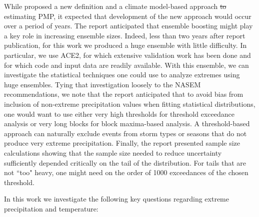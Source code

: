 \documentclass{ametsocV6.1}
\providecommand{\DIFadd}[1]{{\protect\color{blue}\uwave{#1}}} %
\providecommand{\DIFdel}[1]{{\protect\color{red}\sout{#1}}}                      %
\providecommand{\DIFaddbegin}{} %
\providecommand{\DIFaddend}{} %
\providecommand{\DIFdelbegin}{} %
\providecommand{\DIFdelend}{} %
\newcommand{\DIFscaledelfig}{0.5}
\newlength{\DIFdelgraphicswidth} %
\newlength{\DIFdelgraphicsheight} %
\newcommand{\DIFaddincludegraphics}[2][]{{\color{blue}\fbox{\DIFOincludegraphics[#1]{#2}}}} %
\newcommand{\DIFdelincludegraphics}[2][]{%
\sbox{\DIFdelgraphicsbox}{\DIFOincludegraphics[#1]{#2}}%
\settoboxwidth{\DIFdelgraphicswidth}{\DIFdelgraphicsbox} %
\settoboxtotalheight{\DIFdelgraphicsheight}{\DIFdelgraphicsbox} %
\scalebox{\DIFscaledelfig}{%
\parbox[b]{\DIFdelgraphicswidth}{\usebox{\DIFdelgraphicsbox}\\[-\baselineskip] \rule{\DIFdelgraphicswidth}{0em}}\llap{\resizebox{\DIFdelgraphicswidth}{\DIFdelgraphicsheight}{%
\setlength{\unitlength}{\DIFdelgraphicswidth}%
\begin{picture}(1,1)%
\thicklines\linethickness{2pt} %
{\color[rgb]{1,0,0}\put(0,0){\framebox(1,1){}}}%
{\color[rgb]{1,0,0}\put(0,0){\line( 1,1){1}}}%
{\color[rgb]{1,0,0}\put(0,1){\line(1,-1){1}}}%
\end{picture}%
}\hspace*{3pt}}} %
} %
\DeclareRobustCommand{\DIFaddbegin}{\DIFOaddbegin \let\includegraphics\DIFaddincludegraphics} %
\DeclareRobustCommand{\DIFaddend}{\DIFOaddend \let\includegraphics\DIFOincludegraphics} %
\DeclareRobustCommand{\DIFdelbegin}{\DIFOdelbegin \let\includegraphics\DIFdelincludegraphics} %
\DeclareRobustCommand{\DIFdelend}{\DIFOaddend \let\includegraphics\DIFOincludegraphics} %
\begin{document}




While \cite{nasem2024pmp} proposed a new definition and a climate model-based approach \DIFdelbegin \DIFdel{to }\DIFdelend \DIFaddbegin \DIFadd{for }\DIFaddend estimating PMP, it expected that development of the new approach would occur over a period of years. The report anticipated that ensemble boosting might play a key role in increasing ensemble sizes. Indeed, less than two years after report publication, for this work we produced a huge ensemble with little difficulty. In particular, we use ACE2, for which extensive validation work has been done \citep{watt2025ace2} and for which code and input data are readily available. With this ensemble, we can investigate the statistical techniques one could use to analyze extremes using huge ensembles. Tying that investigation loosely to the NASEM recommendations, we note that the report anticipated that to avoid bias from inclusion of non-extreme precipitation values when fitting statistical distributions, one would want to use either very high thresholds  for threshold exceedance analysis or very long blocks for block maxima-based analysis. 
A threshold-based approach can naturally exclude events from storm types or seasons that do not produce very extreme precipitation. Finally, the report presented sample size calculations showing that the sample size needed to reduce uncertainty sufficiently depended critically on the tail of the distribution. For tails that are not ``too" heavy, one might need on the order of 1000 exceedances of the chosen threshold.


In this work we investigate the following key questions regarding extreme precipitation and temperature:
\end{document}
